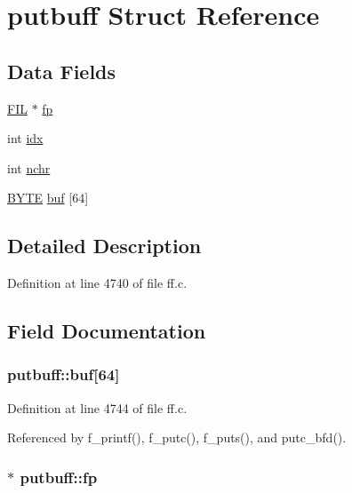 \hypertarget{structputbuff}{\section{putbuff Struct Reference}
\label{structputbuff}
}
\subsection*{Data Fields}
\begin{DoxyCompactItemize}
\item 
\hyperlink{structFIL}{F\-I\-L} $\ast$ \hyperlink{structputbuff_a5c7baa85e569be17f4888f5d92f4453c}{fp}
\item 
int \hyperlink{structputbuff_a10a3ca93af8df07e9836ebd5230c06d8}{idx}
\item 
int \hyperlink{structputbuff_a125366bfe48077e6f562f95e30b4604a}{nchr}
\item 
\hyperlink{integer_8h_a4ae1dab0fb4b072a66584546209e7d58}{B\-Y\-T\-E} \hyperlink{structputbuff_ae623199e5d2851f95050670170f20329}{buf} \mbox{[}64\mbox{]}
\end{DoxyCompactItemize}


\subsection{Detailed Description}


Definition at line 4740 of file ff.\-c.



\subsection{Field Documentation}
\hypertarget{structputbuff_ae623199e5d2851f95050670170f20329}{
\subsubsection[{buf}]{ putbuff\-::buf\mbox{[}64\mbox{]}}}\label{structputbuff_ae623199e5d2851f95050670170f20329}


Definition at line 4744 of file ff.\-c.



Referenced by f\-\_\-printf(), f\-\_\-putc(), f\-\_\-puts(), and putc\-\_\-bfd().

\hypertarget{structputbuff_a5c7baa85e569be17f4888f5d92f4453c}{
\subsubsection[{fp}]{$\ast$ putbuff\-::fp}}\label{structputbuff_a5c7baa85e569be17f4888f5d92f4453c}


